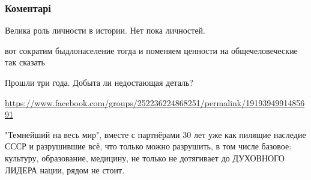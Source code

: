 
 
 
 
 
\subsubsection{Коментарі}
\label{sec:03_09_2021.fb.larichev_jurij.1.liderstvo_nacia_rossia.cmt}

\begin{itemize}
 
Велика роль личности в истории. Нет пока личностей.

 
вот сократим быдлонаселение тогда и поменяем ценности на общечеловеческие так сказать

 
Прошли три года. Добыта ли недостающая деталь?

\url{https://www.facebook.com/groups/252236224868251/permalink/1919394991485691}

 

"Темнейший на весь мир", вместе с партнёрами 30 лет уже как пилящие наследие
СССР и разрушившие всё, что только можно разрушить, в том числе базовое:
культуру, образование, медицину, не только не дотягивает до ДУХОВНОГО ЛИДЕРА
нации, рядом не стоит.


\end{itemize}
